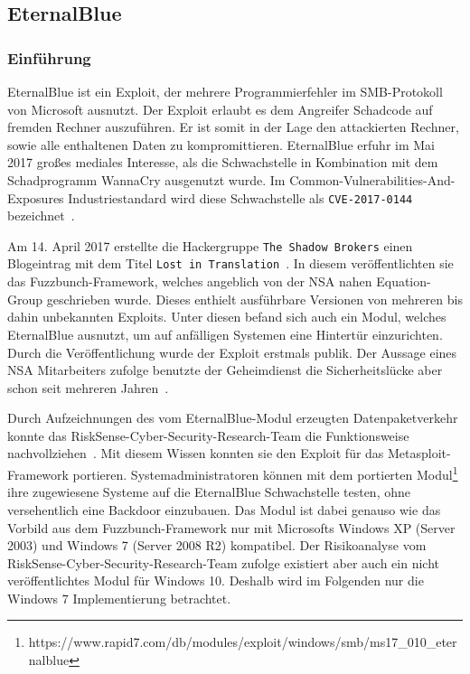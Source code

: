 \documentclass{AIFB_ITI_Crypto_Seminar}
\begin{document}
\clearpage

\subsection{EternalBlue}
\subsubsection{Einführung}
EternalBlue ist ein Exploit, der mehrere Programmierfehler im SMB-Protokoll von Microsoft ausnutzt. Der Exploit erlaubt es dem Angreifer Schadcode auf fremden Rechner auszuführen. Er ist somit in der Lage den attackierten Rechner, sowie alle enthaltenen Daten zu kompromittieren. EternalBlue erfuhr im Mai 2017 großes mediales Interesse, als die Schwachstelle in Kombination mit dem Schadprogramm WannaCry ausgenutzt wurde. Im Common-Vulnerabilities-And-Exposures Industriestandard wird diese Schwachstelle als \texttt{CVE-2017-0144} bezeichnet~\cite{cve}. \par
Am 14. April 2017 erstellte die Hackergruppe \texttt{The Shadow Brokers} einen Blogeintrag mit dem Titel \texttt{Lost in Translation}~\cite{lostintranslation}. In diesem veröffentlichten sie das Fuzzbunch-Framework, welches angeblich von der NSA nahen Equation-Group geschrieben wurde. Dieses enthielt ausführbare Versionen von mehreren bis dahin unbekannten Exploits. Unter diesen befand sich auch ein Modul, welches EternalBlue ausnutzt, um auf anfälligen Systemen eine Hintertür einzurichten. Durch die Veröffentlichung wurde der Exploit erstmals publik. Der Aussage eines NSA Mitarbeiters zufolge benutzte der Geheimdienst die Sicherheitslücke aber schon seit mehreren Jahren~\cite{nsa}.\par
Durch Aufzeichnungen des vom EternalBlue-Modul erzeugten Datenpaketverkehr konnte das RiskSense-Cyber-Security-Research-Team die Funktionsweise nachvollziehen~\cite{eternalblue}. Mit diesem Wissen konnten sie den Exploit für das Metasploit-Framework portieren. Systemadministratoren können mit dem portierten Modul\footnote{https://www.rapid7.com/db/modules/exploit/windows/smb/ms17\_010\_eternalblue} ihre zugewiesene Systeme auf die EternalBlue Schwachstelle testen, ohne versehentlich eine Backdoor einzubauen. Das Modul ist dabei genauso wie das Vorbild aus dem Fuzzbunch-Framework nur mit Microsofts Windows XP (Server 2003) und Windows 7 (Server 2008 R2) kompatibel. Der Risikoanalyse vom RiskSense-Cyber-Security-Research-Team zufolge existiert aber auch ein nicht veröffentlichtes Modul für Windows 10. Deshalb wird im Folgenden nur die Windows 7 Implementierung betrachtet.
\end{document}
